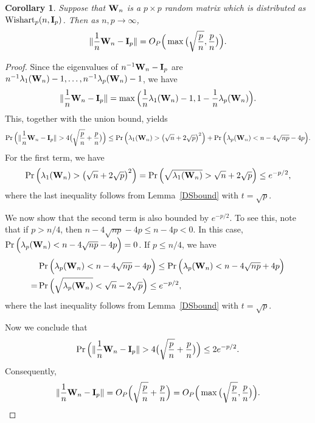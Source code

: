\documentclass[times,sort&compress,3p]{elsarticle}
\theoremstyle{plain}
\newtheorem{corollary}{\quad\quad Corollary}
\theoremstyle{definition}
\theoremstyle{remark}
\begin{document}
\begin{appendices}
\begin{corollary}\label{corNorm}
Suppose that $\mathbf{W}_n$ is a $p \times p$ random matrix which is distributed as $\mathrm{Wishart}_p(n,\mathbf{I}_{p})$.
    Then as $n,p\to \infty$,
$$
    \|\frac{1}{n}\mathbf{W}_n-\mathbf{I}_p\|=O_P\Big(\max\big(\sqrt{\frac{p}{n}},\frac{p}{n}\big)\Big).
$$
\end{corollary}
\begin{proof}
    Since the eigenvalues of $n^{-1}\mathbf{W}_n-\mathbf{I}_p$ are $n^{-1}\lambda_1(\mathbf{W}_n)-1,\ldots, n^{-1}\lambda_p(\mathbf{W}_n)-1$, we have
     $$\|\frac{1}{n}\mathbf{W}_n-\mathbf{I}_p\|=\max\Big(\frac{1}{n}\lambda_1(\mathbf{W}_n)-1,1-\frac{1}{n}\lambda_p(\mathbf{W}_n)\Big).$$
This, together with the union bound, yields
$$
    \Pr\Big(\|\frac{1}{n}\BW_n-\BI_p\|>4\big(\sqrt{\frac{p}{n}}+\frac{p}{n}\big)\Big)
    \leq
    \Pr\Big(\lambda_1(\BW_n)>\big(\sqrt{n}+2\sqrt{p}\big)^2\Big)+
    \Pr\Big(\lambda_p(\BW_n)<n-4\sqrt{np}-4p\Big).
$$
    For the first term, we have    $$
    \Pr\Big(\lambda_1(\mathbf{W}_n)>\big(\sqrt{n}+2\sqrt{p}\big)^2\Big)=
    \Pr\Big(\sqrt{\lambda_1(\mathbf{W}_n)}>\sqrt{n}+2\sqrt{p}\Big)\leq e^{-p/2},
    $$
 where the last inequality follows from Lemma~\ref{DSbound} with $t=\sqrt{p}$.

    We now show that the second term is also bounded by $e^{-p/2}$.
    To see this, note that if $p>n/4$, then $n-4\sqrt{np}-4p\leq n-4p<0$.
    In this case, $\Pr\Big(\lambda_p(\mathbf{W}_n)<n-4\sqrt{np}-4p\Big)=0$.
    If $p\leq n/4$, we have
    $$
    \begin{aligned}
        &\Pr\Big(\lambda_p(\mathbf{W}_n)<n-4\sqrt{np}-4p\Big)
    \leq
    \Pr\Big(\lambda_p(\mathbf{W}_n)<n-4\sqrt{np}+4p\Big)\\
        =&
    \Pr\Big(\sqrt{\lambda_p(\mathbf{W}_n)}<\sqrt{n}-2\sqrt{p}\Big)
        \leq e^{-p/2},
    \end{aligned}
    $$
    where the last inequality follows from Lemma~\ref{DSbound} with $t=\sqrt{p}$.

    Now we conclude that
    $$
    \Pr\Big(\|\frac{1}{n}\BW_n-\BI_p\|>4\big(\sqrt{\frac{p}{n}}+\frac{p}{n}\big)\Big)
    \leq 2 e^{-p/2}.
    $$
    Consequently,
    $$\|\frac{1}{n}\mathbf{W}_n-\mathbf{I}_p\|=O_P\Big(\sqrt{\frac{p}{n}}+\frac{p}{n}\Big)=O_P\Big(\max\big(\sqrt{\frac{p}{n}},\frac{p}{n}\big)\Big).$$
\end{proof}




\end{appendices}
\end{document}
